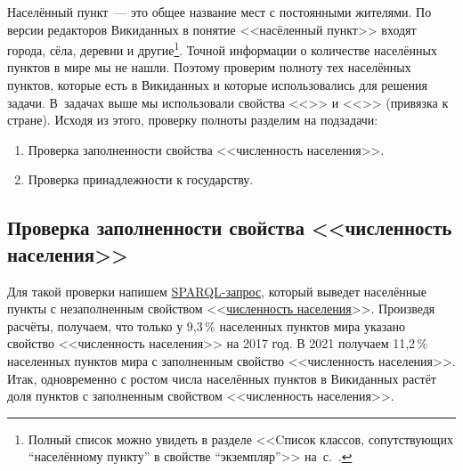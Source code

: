 Населённый пункт~--- это общее название мест с постоянными жителями\autocite{Humansettlements_Dictionary}. 
По версии редакторов Викиданных в понятие <<насёленный пункт>> входят города, сёла, деревни 
и другие\footnote{%
    Полный список можно увидеть в разделе 
    <<Cписок классов, сопутствующих ``населённому пункту'' в свойстве ``экземпляр''>> 
    на~с.~\pageref{human-settlement:tag1}.%
}. 
Точной информации о количестве населённых пунктов в мире мы не нашли. 
Поэтому проверим полноту тех населённых пунктов, которые есть в Викиданных 
и которые использовались для решения задачи. 
В~задачах выше мы использовали свойства <<>> и 
<<>> (привязка к стране). 
Исходя из этого, проверку полноты разделим на подзадачи: 
\begin{enumerate} 
  \item Проверка заполненности свойства <<численность населения>>.
  \item Проверка принадлежности к государству.
\end{enumerate}


\subsection{Проверка заполненности свойства <<численность населения>> }

Для такой проверки напишем \href{https://w.wiki/4FUz}{SPARQL-запрос}, 
который выведет населённые пункты 
с незаполненным свойством <<\href{http://www.wikidata.org/entity/P1082}{численность населения}>>. 
Произведя расчёты, получаем, что только у 9,3\,\% населенных пунктов мира 
указано свойство <<численность населения>> на 2017 год. 
В 2021 получаем 11,2\,\% населенных пунктов мира с заполненным свойство <<численность населения>>. 
Итак, одновременно с ростом числа населённых пунктов в Викиданных 
растёт доля пунктов с заполненным свойством <<численность населения>>.


